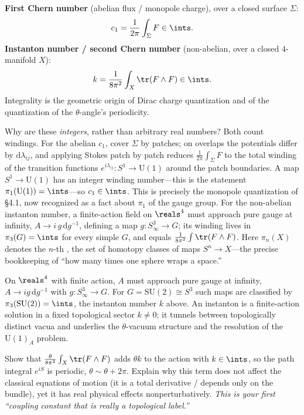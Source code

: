 \documentclass[11pt]{article}
\newcommand{\dd}{\mathrm{d}}                 %
\newcommand{\Uone}{\mathrm{U}(1)}
\begin{document}
\begin{eequation}
\textbf{First Chern number} (abelian flux / monopole charge), over a closed surface
$\Sigma$:
\[
c_1 = \frac{1}{2\pi}\int_\Sigma F \in \ints.
\]
\textbf{Instanton number / second Chern number} (non-abelian, over a closed $4$-manifold
$X$):
\[
k = \frac{1}{8\pi^2}\int_X \tr(F\wedge F) \in \ints.
\]
Integrality is the geometric origin of Dirac charge quantization and of the
quantization of the $\theta$-angle's periodicity.
\end{eequation}

Why are these \emph{integers}, rather than arbitrary real numbers? Both count windings.
For the abelian $c_1$, cover $\Sigma$ by patches; on overlaps the potentials differ by
$\dd\lambda_{ij}$, and applying Stokes patch by patch reduces $\frac{1}{2\pi}\int_\Sigma F$
to the total winding of the transition functions $e^{i\lambda_{ij}}:S^1\to\Uone$ around the
patch boundaries. A map $S^1\to\Uone$ has an integer winding number---this is the
statement $\pi_1(\Uone)=\ints$---so $c_1\in\ints$. This is precisely the monopole
quantization of \S4.1, now recognized as a fact about $\pi_1$ of the gauge group. For the
non-abelian instanton number, a finite-action field on $\reals^4$ must approach pure gauge
at infinity, $A\to i\,g\,\dd g^{-1}$, defining a map $g:S^3_\infty\to G$; its winding lives
in $\pi_3(G)=\ints$ for every simple $G$, and equals $\frac{1}{8\pi^2}\int\tr(F\wedge F)$.
Here $\pi_n(X)$ denotes the $n$-th , the set of homotopy classes of
maps $S^n\to X$---the precise bookkeeping of ``how many times one sphere wraps a space.''

\begin{eexample}[Instantons]
On $\reals^4$ with finite action, $A$ must approach pure gauge at infinity,
$A\to ig\,\dd g^{-1}$ with $g:S^3_\infty\to G$. For $G=\mathrm{SU}(2)\cong S^3$ such maps
are classified by $\pi_3(\mathrm{SU}(2))=\ints$, the instanton number $k$ above. An
instanton is a finite-action solution in a fixed topological sector $k\neq0$; it
tunnels between topologically distinct vacua and underlies the $\theta$-vacuum
structure and the resolution of the $\mathrm{U}(1)_A$ problem.
\end{eexample}

\begin{xca}
Show that $\frac{\theta}{8\pi^2}\int_X \tr(F\wedge F)$ adds $\theta k$ to the action with
$k\in\ints$, so the path integral $e^{iS}$ is periodic, $\theta\sim\theta+2\pi$. Explain
why this term does not affect the classical equations of motion (it is a total
derivative / depends only on the bundle), yet it has real physical effects
nonperturbatively. \emph{This is your first ``coupling constant that is really a
topological label.''}
\end{xca}
\end{document}
